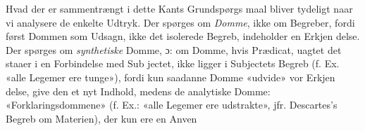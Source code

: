 \documentclass[12pt,a4paper]{book}
\begin{document}
Hvad der er sammentrængt i dette Kants Grundspørgs\-%
maal bliver tydeligt naar vi analysere de enkelte Udtryk. Der
spørges om \emph{Domme}, ikke om Begreber, fordi først Dommen
som Udsagn, ikke det isolerede Begreb, indeholder en Erkjen\-%
\setcounter{footnote}{0}%
delse. Der spørges om \emph{synthetiske} Domme, ɔ: om Domme,
hvis Prædicat, uagtet det staaer i en Forbindelse med Sub\-%
jectet, ikke ligger i Subjectets Begreb (f. Ex. «alle Legemer
ere tunge»), fordi kun saadanne Domme «udvide» vor Erkjen\-%
delse, give den et nyt Indhold, medens de analytiske Domme:
«Forklaringsdommene» (f. Ex.: «alle Legemer ere udstrakte»,
jfr. Descartes's Begreb om Materien), der kun ere en Anven\-%
\end{document}
